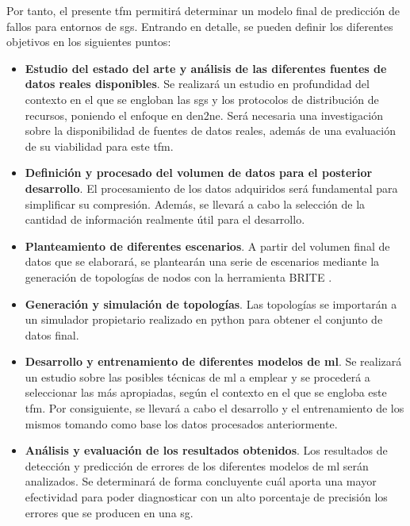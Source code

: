 \vspace{3mm}

Por tanto, el presente \gls{tfm} permitirá determinar un modelo final de predicción de fallos para entornos de \gls{sg}s. Entrando en detalle, se pueden definir los diferentes objetivos en los siguientes puntos:

\begin{itemize}
    \item \textbf{Estudio del estado del arte y análisis de las diferentes fuentes de datos reales disponibles}. Se realizará un estudio en profundidad del contexto en el que se engloban las \gls{sg}s y los protocolos de distribución de recursos, poniendo el enfoque en  \gls{den2ne}. Será necesaria una investigación sobre la disponibilidad de  fuentes de datos reales, además de una evaluación de su viabilidad para este \gls{tfm}.
    
    \item \textbf{Definición y procesado del volumen de datos para el posterior desarrollo}. El procesamiento de los datos adquiridos será fundamental para simplificar su compresión. Además, se llevará a cabo la selección de la cantidad de información realmente útil para el desarrollo.    

    \item \textbf{Planteamiento de diferentes escenarios}. A partir del volumen final de datos que se elaborará, se plantearán una serie de escenarios mediante la generación de topologías de nodos con la herramienta BRITE \cite{brite}.
    
    \item \textbf{Generación y simulación de topologías}. Las topologías se importarán a un simulador propietario realizado en python para obtener el conjunto de datos final.
    
    \item \textbf{Desarrollo y entrenamiento de diferentes modelos de \gls{ml}}. Se realizará un estudio sobre las posibles técnicas de \gls{ml} a emplear y se procederá a seleccionar las más apropiadas, según el contexto en el que se engloba este \gls{tfm}. Por consiguiente, se llevará a cabo el desarrollo y el entrenamiento de los mismos tomando como base los datos procesados anteriormente. 
    
    \item \textbf{Análisis y evaluación de los resultados obtenidos}. Los resultados de detección y predicción de errores de los diferentes modelos de \gls{ml} serán analizados. Se determinará de forma concluyente cuál aporta una mayor efectividad para poder diagnosticar con un alto porcentaje de precisión los errores que se producen en una \gls{sg}.
    
\end{itemize}

